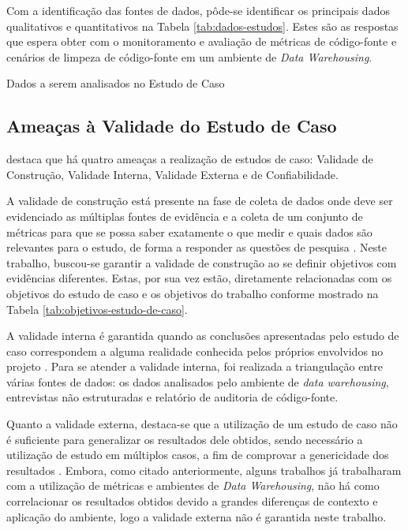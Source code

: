Com a identificação das fontes de dados, pôde-se identificar os principais dados qualitativos e quantitativos na Tabela \ref{tab:dados-estudos}. Estes são as respostas que espera obter com o monitoramento e avaliação de métricas de código-fonte e cenários de limpeza de código-fonte em um ambiente de \textit{Data Warehousing}.

\begin{table}[H]
\begin{center}

\caption{Dados a serem analisados no Estudo de Caso}
\label{tab:dados-estudos}
\end{center}
\end{table}
\FloatBarrier

\subsection{Ameaças à Validade do Estudo de Caso}
\label{sec:validade-estudo}

 destaca que há quatro ameaças a realização de estudos de caso: Validade de Construção, Validade Interna, Validade Externa e de Confiabilidade.

A validade de construção está presente na fase de coleta de dados onde deve ser evidenciado as múltiplas fontes de evidência e a coleta de um conjunto de métricas para que se possa saber exatamente o que medir e quais dados são relevantes para o estudo, de forma a responder as questões de pesquisa \cite{yin2011applications}. Neste trabalho, buscou-se garantir a validade de construção ao se definir objetivos com evidências diferentes. Estas, por sua vez estão, diretamente relacionadas com os objetivos do estudo de caso e os objetivos do trabalho conforme mostrado na Tabela \ref{tab:objetivos-estudo-de-caso}.

A validade interna é garantida quando as conclusões apresentadas pelo estudo de caso correspondem a alguma realidade conhecida pelos próprios envolvidos no projeto \cite{yin2011applications}. Para se atender a validade interna, foi realizada a triangulação entre várias fontes de dados: os dados analisados pelo ambiente de \textit{data warehousing}, entrevistas não estruturadas e relatório de auditoria de código-fonte. 

Quanto a validade externa, destaca-se que a utilização de um estudo de caso não é suficiente para generalizar os resultados dele obtidos, sendo necessário a utilização de estudo em múltiplos casos, a fim de comprovar a genericidade dos resultados \cite{yin2011applications}. Embora, como citado anteriormente, alguns trabalhos já trabalharam com a utilização de métricas e ambientes de \textit{Data Warehousing}, não há como correlacionar os resultados obtidos devido a grandes diferenças de contexto e aplicação do ambiente, logo a validade externa não é garantida neste trabalho.

